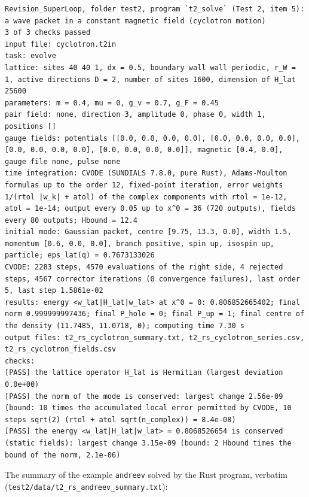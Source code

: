 \documentclass[
  10pt,
]{article}
\begin{document}
\begin{verbatim}
Revision_SuperLoop, folder test2, program `t2_solve` (Test 2, item 5): a wave packet in a constant magnetic field (cyclotron motion)
3 of 3 checks passed
input file: cyclotron.t2in
task: evolve
lattice: sites 40 40 1, dx = 0.5, boundary wall wall periodic, r_W = 1, active directions D = 2, number of sites 1600, dimension of H_lat 25600
parameters: m = 0.4, mu = 0, g_v = 0.7, g_F = 0.45
pair field: none, direction 3, amplitude 0, phase 0, width 1, positions []
gauge fields: potentials [[0.0, 0.0, 0.0, 0.0], [0.0, 0.0, 0.0, 0.0], [0.0, 0.0, 0.0, 0.0], [0.0, 0.0, 0.0, 0.0]], magnetic [0.4, 0.0], gauge file none, pulse none
time integration: CVODE (SUNDIALS 7.8.0, pure Rust), Adams-Moulton formulas up to the order 12, fixed-point iteration, error weights 1/(rtol |w_k| + atol) of the complex components with rtol = 1e-12, atol = 1e-14; output every 0.05 up to x^0 = 36 (720 outputs), fields every 80 outputs; Hbound = 12.4
initial mode: Gaussian packet, centre [9.75, 13.3, 0.0], width 1.5, momentum [0.6, 0.0, 0.0], branch positive, spin up, isospin up, particle; eps_lat(q) = 0.7673133026
CVODE: 2283 steps, 4570 evaluations of the right side, 4 rejected steps, 4567 corrector iterations (0 convergence failures), last order 5, last step 1.5861e-02
results: energy <w_lat|H_lat|w_lat> at x^0 = 0: 0.806852665402; final norm 0.999999997436; final P_hole = 0; final P_up = 1; final centre of the density (11.7485, 11.0718, 0); computing time 7.30 s
output files: t2_rs_cyclotron_summary.txt, t2_rs_cyclotron_series.csv, t2_rs_cyclotron_fields.csv
checks:
[PASS] the lattice operator H_lat is Hermitian (largest deviation 0.0e+00)
[PASS] the norm of the mode is conserved: largest change 2.56e-09 (bound: 10 times the accumulated local error permitted by CVODE, 10 steps sqrt(2) (rtol + atol sqrt(n_complex)) = 8.4e-08)
[PASS] the energy <w_lat|H_lat|w_lat> = 0.8068526654 is conserved (static fields): largest change 3.15e-09 (bound: 2 Hbound times the bound of the norm, 2.1e-06)
\end{verbatim}

The summary of the example \texttt{andreev} solved by the Rust program,
verbatim (\texttt{test2/data/t2\_rs\_andreev\_summary.txt}):
\end{document}

